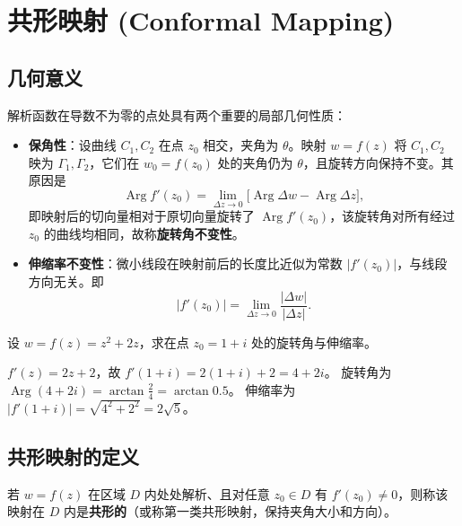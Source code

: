 \chapter{共形映射 (Conformal Mapping)}

\section{几何意义}
解析函数在导数不为零的点处具有两个重要的局部几何性质：
\begin{itemize}
  \item \textbf{保角性}：设曲线 \(C_1,C_2\) 在点 \(z_0\) 相交，夹角为 \(\theta\)。映射 \(w=f(z)\) 将 \(C_1,C_2\) 映为 \(\Gamma_1,\Gamma_2\)，它们在 \(w_0=f(z_0)\) 处的夹角仍为 \(\theta\)，且旋转方向保持不变。其原因是
  \[
  \operatorname{Arg} f'(z_0) = \lim_{\Delta z\to 0}\bigl[\operatorname{Arg}\Delta w - \operatorname{Arg}\Delta z\bigr],
  \]
  即映射后的切向量相对于原切向量旋转了 \(\operatorname{Arg} f'(z_0)\)，该旋转角对所有经过 \(z_0\) 的曲线均相同，故称\textbf{旋转角不变性}。
  \item \textbf{伸缩率不变性}：微小线段在映射前后的长度比近似为常数 \(|f'(z_0)|\)，与线段方向无关。即
  \[
  |f'(z_0)| = \lim_{\Delta z\to 0}\frac{|\Delta w|}{|\Delta z|}.
  \]
\end{itemize}

\begin{example}
  设 \(w = f(z) = z^2 + 2z\)，求在点 \(z_0 = 1+i\) 处的旋转角与伸缩率。
\end{example}
\begin{solution}
  \(f'(z) = 2z + 2\)，故 \(f'(1+i) = 2(1+i)+2 = 4+2i\)。
  旋转角为 \(\operatorname{Arg}(4+2i) = \arctan\frac{2}{4} = \arctan 0.5\)。
  伸缩率为 \(|f'(1+i)| = \sqrt{4^2+2^2} = 2\sqrt{5}\)。
\end{solution}

\section{共形映射的定义}
\begin{definition}[共形映射]
  若 \(w = f(z)\) 在区域 \(D\) 内处处解析、且对任意 \(z_0 \in D\) 有 \(f'(z_0) \neq 0\)，则称该映射在 \(D\) 内是\textbf{共形的}（或称第一类共形映射，保持夹角大小和方向）。
\end{definition}

